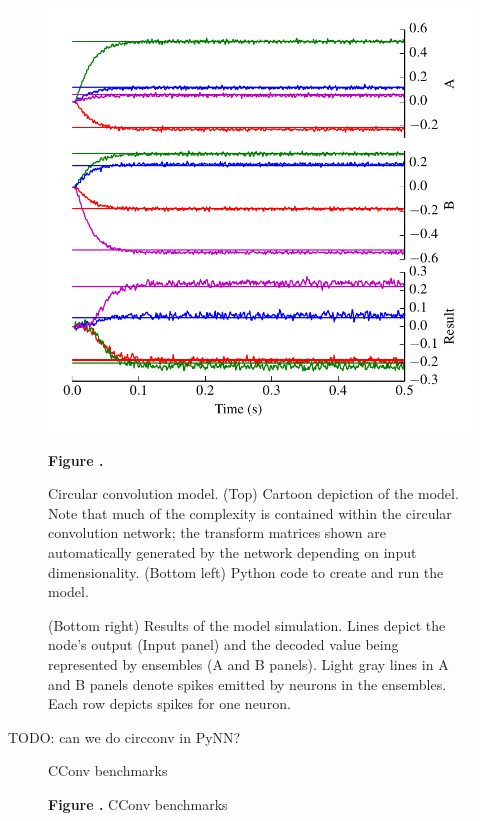 \documentclass{frontiersSCNS}
\begin{document}
\begin{figure}
\begin{center}
  \begin{minipage}{0.43\textwidth}
    \includegraphics[width=\textwidth]{cconv_res}
  \end{minipage}
\end{center}
 \textbf{\label{fig:lorenz} Figure .}{
   Circular convolution model. (Top) Cartoon depiction of the model.
   Note that much of the complexity is contained within the
   circular convolution network; the transform matrices shown
   are automatically generated by the network depending on
   input dimensionality.
   (Bottom left) Python code to create and run the model.

   (Bottom right) Results of the model simulation. Lines depict
   the node's output (Input panel) and the decoded value being represented
   by ensembles (A and B panels). Light gray lines in A and B panels denote
   spikes emitted by neurons in the ensembles. Each row depicts spikes
   for one neuron.}
\end{figure}

TODO: can we do circconv in PyNN?

\begin{figure}
\begin{center}
  CConv benchmarks
\end{center}
 \textbf{\label{fig:01} Figure .}{
   CConv benchmarks}
\end{figure}
\end{document}
